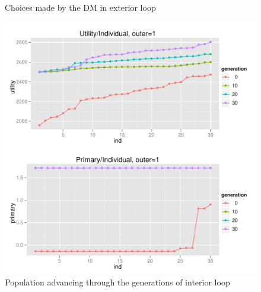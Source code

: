 \begin{figure}
{{      \label{c2_dmchoices_03}
    }
  }
  \caption{Choices made by the DM in exterior loop}
\end{figure}


\begin{figure}
  \centering \includegraphics[width=1.0\textwidth]{exp/nouncert/c2_utilind_01}
  \caption{Population advancing through the generations of interior loop}
  \label{c2_utilind_01}
\end{figure}

